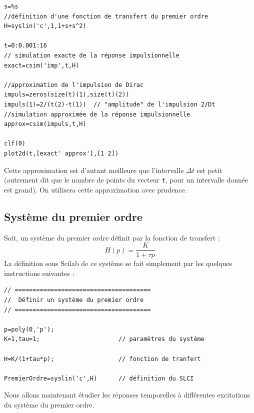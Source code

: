 \begin{code}
    \begin{verbatim}
s=%s
//définition d'une fonction de transfert du premier ordre
H=syslin('c',1,1+s+s^2)

t=0:0.001:16
// simulation exacte de la réponse impulsionnelle
exact=csim('imp',t,H)

//approximation de l'impulsion de Dirac
impuls=zeros(size(t)(1),size(t)(2))
impuls(1)=2/(t(2)-t(1))  // "amplitude" de l'impulsion 2/Dt  
//simulation approximée de la réponse impulsionnelle
approx=csim(impuls,t,H)

clf(0)
plot2d(t,[exact' approx'],[1 2])
\end{verbatim}
\end{code}

Cette approximation est d'autant meilleure que l'intervalle $\Delta t$ est petit 
(autrement dit que le nombre de points du vecteur \verb?t?, pour un 
intervalle donnée est grand). On utilisera cette approximation avec prudence.

\subsection{Système du premier ordre}
Soit, un système du premier ordre définit par la fonction de transfert : 
$$
H(p)=\dfrac{K}{1+\tau p }
$$
La définition sous Scilab de ce système se fait simplement par les quelques 
instructions suivantes :
\begin{code}
\begin{verbatim}
// ======================================
//  Définir un système du premier ordre
// ======================================

p=poly(0,'p');
K=1,tau=1;                      // paramètres du système

H=K/(1+tau*p);                  // fonction de tranfert

PremierOrdre=syslin('c',H)      // définition du SLCI
\end{verbatim}
\end{code}

Nous allons maintenant étudier les réponses temporelles 
à différentes excitations du système du premier ordre.
